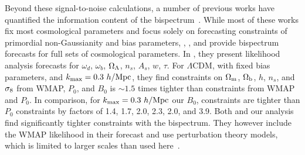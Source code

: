 Beyond these signal-to-noise calculations, a number of previous works 
have quantified the information content of the bispectrum~\citep{scoccimarro2004, sefusatti2006, sefusatti2007, song2015, tellarini2016, yamauchi2017a, karagiannis2018, yankelevich2019, chudaykin2019, coulton2019, reischke2019}. 
While most of these works fix most cosmological parameters and focus solely 
on forecasting constraints of primordial non-Gaussianity and bias parameters, 
\cite{sefusatti2006}, \cite{yankelevich2019}, and \cite{chudaykin2019} provide 
bispectrum forecasts for full sets of cosmological parameters. In \cite{sefusatti2006}, 
they present likelihood analysis forecasts for $\omega_d$, $\omega_b$, $\Omega_\Lambda$, 
$n_s$, $A_s$, $w$, $\tau$. %
For $\Lambda$CDM, with fixed bias parameters, and $k_{\rm max} = 0.3~h/{\rm Mpc}$, 
they find constraints on $\Omega_{\rm m}$, $\Omega_{\rm b}$, $h$, $n_s$, and $\sigma_8$ from WMAP, 
$P_0$, and $B_0$ is $\sim 1.5$ times tighter than constraints from WMAP 
and $P_0$. In comparison, for 
$k_{\rm max} = 0.3~h/{\rm Mpc}$ our $B_0$, constraints are tighter than $P_0$ constraints 
by factors of 1.4, 1.7, 2.0, 2.3, 2.0, and 3.9. Both \cite{sefusatti2006} and our 
analysis find significantly tighter constraints with the bispectrum. 
They however include the WMAP likelihood in their forecast and use 
perturbation theory models, which is limited to larger scales than used 
here~\citep{scoccimarro1998a, scoccimarro1999a, sefusatti2010, pollack2012, gil-marin2014, lazanu2016, eggemeier2019}.

